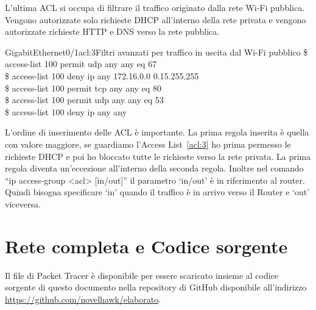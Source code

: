 L'ultima ACL si occupa di filtrare il traffico originato dalla rete Wi-Fi pubblica. Vengono autorizzate solo richieste DHCP all'interno della rete privata e vengono autorizzate richieste HTTP e DNS verso la rete pubblica.

\begin{cmds}[in]{GigabitEthernet0/1}{acl:3}{Filtri avanzati per traffico in uscita dal Wi-Fi pubblico}
    \$ access-list 100 permit udp any any eq 67\\
    \$ access-list 100 deny ip any 172.16.0.0 0.15.255.255\\
    \$ access-list 100 permit tcp any any eq 80\\
    \$ access-list 100 permit udp any any eq 53\\
    \$ access-list 100 deny ip any any
\end{cmds}

L'ordine di inserimento delle ACL \`e importante. La prima regola inserita \`e quella con valore maggiore, se guardiamo l'Access List~\ref{acl:3} ho prima permesso le richieste DHCP e poi ho bloccato tutte le richieste verso la rete privata. La prima regola diventa un'eccezione all'interno della seconda regola. Inoltre nel comando ``ip access-group <acl> [in/out]'' il parametro `in/out' \`e in riferimento al router. Quindi bisogna specificare `in' quando il traffico \`e in arrivo verso il Router e `out' viceversa.

\setlength{\parskip}{0em}

\section{Rete completa e Codice sorgente}

Il file di Packet Tracer \`e disponibile per essere scaricato insieme al codice sorgente di questo documento nella repository di GitHub disponibile all'indirizzo \url{https://github.com/novelhawk/elaborato}.
